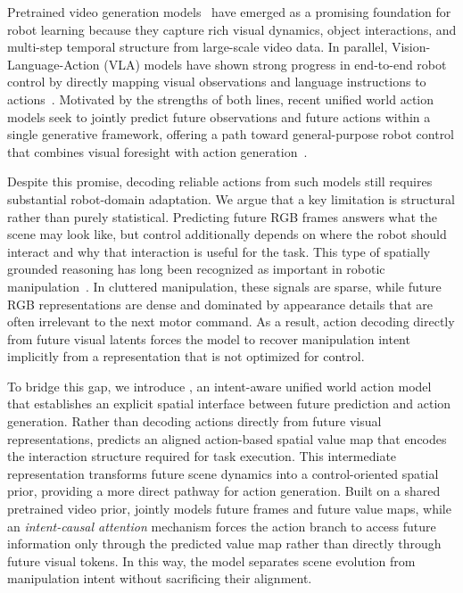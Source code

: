 
Pretrained video generation models~\cite{dreamzero,wan2025wan,hu2024vpp,liang2025videogenerators} have emerged as a promising foundation for robot learning because they capture rich visual dynamics, object interactions, and multi-step temporal structure from large-scale video data. In parallel, Vision-Language-Action (VLA) models have shown strong progress in end-to-end robot control by directly mapping visual observations and language instructions to actions~\cite{rt2,palme,openvla,atomvla,llava-vla,pi0,pi05}. Motivated by the strengths of both lines, recent unified world action models seek to jointly predict future observations and future actions within a single generative framework, offering a path toward general-purpose robot control that combines visual foresight with action generation~\cite{unified_wm,li2026causal,bi2025motusunifiedlatentaction,pertsch2025fast,gigaworld,dreamzero}.

Despite this promise, decoding reliable actions from such models still requires substantial robot-domain adaptation. We argue that a key limitation is structural rather than purely statistical. Predicting future RGB frames answers what the scene may look like, but control additionally depends on where the robot should interact and why that interaction is useful for the task. This type of spatially grounded reasoning has long been recognized as important in robotic manipulation~\cite{shridhar2022cliport,mo2021where2act,shridhar2023peract,wi2023calamari}. In cluttered manipulation, these signals are sparse, while future RGB representations are dense and dominated by appearance details that are often irrelevant to the next motor command. As a result, action decoding directly from future visual latents forces the model to recover manipulation intent implicitly from a representation that is not optimized for control.

To bridge this gap, we introduce \textbf{\method}, an intent-aware unified world action model that establishes an explicit spatial interface between future prediction and action generation. Rather than decoding actions directly from future visual representations, \method predicts an aligned action-based spatial value map that encodes the interaction structure required for task execution. This intermediate representation transforms future scene dynamics into a control-oriented spatial prior, providing a more direct pathway for action generation. Built on a shared pretrained video prior, \method jointly models future frames and future value maps, while an \emph{intent-causal attention} mechanism forces the action branch to access future information only through the predicted value map rather than directly through future visual tokens. In this way, the model separates scene evolution from manipulation intent without sacrificing their alignment.

